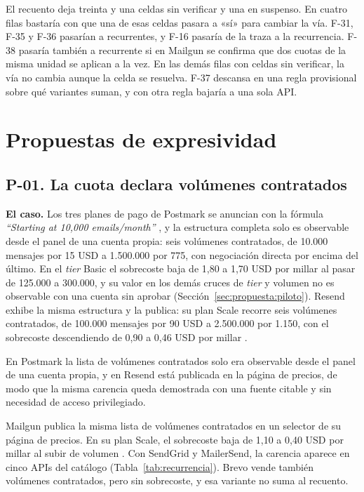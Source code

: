 El recuento deja treinta y una celdas sin verificar y una en suspenso.
En cuatro filas bastaría con que una de esas celdas pasara a «sí» para cambiar la vía.
F-31, F-35 y F-36 pasarían a recurrentes, y F-16 pasaría de la traza a la recurrencia.
F-38 pasaría también a recurrente si en Mailgun se confirma que dos cuotas de la misma unidad se aplican a la vez.
En las demás filas con celdas sin verificar, la vía no cambia aunque la celda se resuelva.
F-37 descansa en una regla provisional sobre qué variantes suman, y con otra regla bajaría a una sola API.

\section{Propuestas de expresividad}
\label{sec:evolucion:expresividad}

\subsection{P-01. La cuota declara volúmenes contratados}
\label{subsec:evolucion:p01}

\textbf{El caso.} Los tres planes de pago de Postmark se anuncian con la fórmula
\textit{``Starting at 10,000 emails/month''} \citep{postmarkpricing}, y la
estructura completa solo es observable desde el panel de una cuenta propia: seis
volúmenes contratados, de 10.000 mensajes por 15 USD a 1.500.000 por 775, con
negociación directa por encima del último. En el \textit{tier} Basic el sobrecoste
baja de 1,80 a 1,70 USD por millar al pasar de 125.000 a 300.000, y su valor
en los demás cruces de \textit{tier} y volumen no es observable con una cuenta sin
aprobar (Sección~\ref{sec:propuesta:piloto}). Resend exhibe la misma estructura y
la publica: su plan Scale recorre seis volúmenes contratados, de 100.000 mensajes
por 90 USD a 2.500.000 por 1.150, con el sobrecoste descendiendo de 0,90 a
0,46 USD por millar \citep{resendpricing}.

En Postmark la lista de volúmenes contratados solo era observable desde el panel
de una cuenta propia, y en Resend está publicada en la página de precios, de modo
que la misma carencia queda demostrada con una fuente citable y sin necesidad de
acceso privilegiado.

Mailgun publica la misma lista de volúmenes contratados en un selector de su página de precios.
En su plan Scale, el sobrecoste baja de 1,10 a 0,40 USD por millar al subir de volumen \citep{mailgunpricing}.
Con SendGrid y MailerSend, la carencia aparece en cinco APIs del catálogo (Tabla~\ref{tab:recurrencia}).
Brevo vende también volúmenes contratados, pero sin sobrecoste, y esa variante no suma al recuento.

